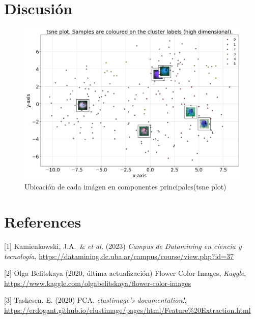 \documentclass{article}
\begin{document}
\section{Discusión}

\begin{figure}
  \centering
  \includegraphics[width= 0.8\linewidth]{tsne}
  \caption{Ubicación de cada imágen en componentes principales(tsne plot)}
\end{figure}

\section*{References}

\medskip
{
\small

[1] Kamienkowski, J.A.\ \& \emph{et al.} (2023) {\it Campus de Datamining en ciencia y tecnología}, \url{https://datamining.dc.uba.ar/campus/course/view.php?id=37}

[2] Olga Belitskaya (2020, última actualización) Flower Color Images, {\it Kaggle}, \url{https://www.kaggle.com/olgabelitskaya/flower-color-images}

[3] Taskesen, E. (2020) PCA, {\it clustimage's documentation!}, \url{https://erdogant.github.io/clustimage/pages/html/Feature%20Extraction.html}
}

\end{document}
